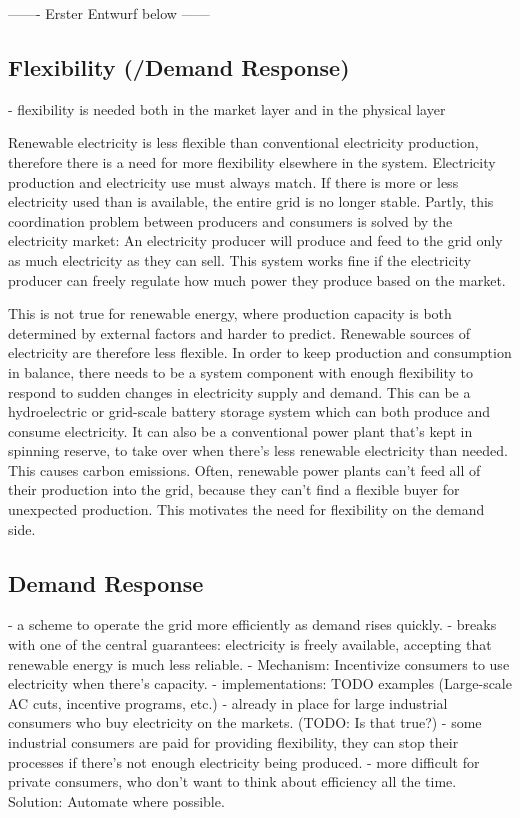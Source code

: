\clearpage
------- Erster Entwurf below ------

\subsection{Flexibility (/Demand Response)}


- flexibility is needed both in the market layer and in the physical layer

Renewable electricity is less flexible than conventional electricity production, therefore there is a need for more flexibility elsewhere in the system.
Electricity production and electricity use must always match. If there is more or less electricity used than is available, the entire grid is no longer stable.
Partly, this coordination problem between producers and consumers is solved by the electricity market:
An electricity producer will produce and feed to the grid only as much electricity as they can sell.
This system works fine if the electricity producer can freely regulate how much power they produce based on the market.

This is not true for renewable energy, where production capacity is both determined by external factors and harder to predict.
Renewable sources of electricity are therefore less flexible.
In order to keep production and consumption in balance, there needs to be a system component with enough flexibility to respond to sudden changes in electricity supply and demand.
This can be a hydroelectric or grid-scale battery storage system which can both produce and consume electricity.
It can also be a conventional power plant that's kept in spinning reserve, to take over when there's less renewable electricity than needed. This causes carbon emissions.
Often, renewable power plants can't feed all of their production into the grid, because they can't find a flexible buyer for unexpected production.
This motivates the need for flexibility on the demand side.



\subsection{Demand Response}
- a scheme to operate the grid more efficiently as demand rises quickly.
- breaks with one of the central guarantees: electricity is freely available, accepting that renewable energy is much less reliable.
- Mechanism: Incentivize consumers to use electricity when there's capacity.
- implementations: TODO examples (Large-scale AC cuts, incentive programs, etc.)
- already in place for large industrial consumers who buy electricity on the markets. (TODO: Is that true?)
    - some industrial consumers are paid for providing flexibility, they can stop their processes if there's not enough electricity being produced.
- more difficult for private consumers, who don't want to think about efficiency all the time. Solution: Automate where possible.



